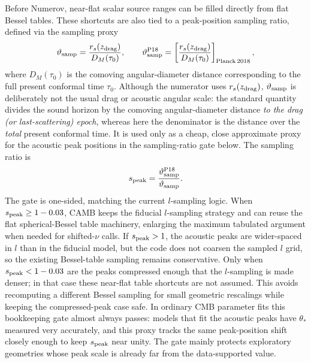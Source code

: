 \documentclass[11pt,a4paper]{article}
\begin{document}
Before Numerov, near-flat scalar source ranges can be filled directly from flat
Bessel tables.  These shortcuts are also tied to a peak-position sampling ratio,
defined via the sampling proxy
\begin{equation}
  \vartheta_{\rm samp}
  =\frac{r_s(z_{\rm drag})}{D_M(\tau_0)},\qquad
  \vartheta_{\rm samp}^{\rm P18}
  =\left[
  \frac{r_s(z_{\rm drag})}{D_M(\tau_0)}
  \right]_{\rm Planck\,2018},
\end{equation}
where \(D_M(\tau_0)\) is the comoving angular-diameter distance corresponding to
the full present conformal time \(\tau_0\).  Although the numerator uses
\(r_s(z_{\rm drag})\), \(\vartheta_{\rm samp}\) is deliberately not the usual
drag or acoustic angular scale: the standard quantity divides the sound horizon
by the comoving angular-diameter distance \emph{to the drag (or last-scattering)
epoch}, whereas here the denominator is the distance over the \emph{total}
present conformal time.  It is used only as a cheap, close approximate proxy for
the acoustic peak positions in the sampling-ratio gate below.  The sampling
ratio is
\begin{equation}
  s_{\rm peak}=\frac{\vartheta_{\rm samp}^{\rm P18}}{\vartheta_{\rm samp}}.
\end{equation}
The gate is one-sided, matching the current \(l\)-sampling logic.  When
\(s_{\rm peak}\ge1-0.03\), CAMB keeps the fiducial \(l\)-sampling strategy and
can reuse the flat spherical-Bessel table machinery, enlarging the maximum
tabulated argument when needed for shifted-\(\nu\) calls.  If \(s_{\rm peak}>1\),
the acoustic peaks are wider-spaced in \(l\) than in the fiducial model, but the
code does not coarsen the sampled \(l\) grid, so the existing Bessel-table
sampling remains conservative.  Only when \(s_{\rm peak}<1-0.03\) are the peaks
compressed enough that the \(l\)-sampling is made denser; in that case these
near-flat table shortcuts are not assumed.  This avoids recomputing a different
Bessel sampling for small geometric rescalings while keeping the compressed-peak
case safe.  In ordinary CMB parameter fits this bookkeeping gate almost always
passes: models that fit the acoustic peaks have \(\theta_*\) measured very
accurately, and this proxy tracks the same peak-position shift closely enough to
keep \(s_{\rm peak}\) near unity.  The gate mainly protects exploratory
geometries whose peak scale is already far from the data-supported value.
\end{document}
